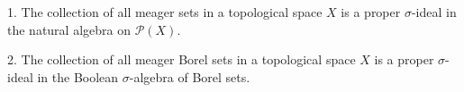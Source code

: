 1. The collection of all meager sets in a topological space $X$ is a proper $\sigma$-ideal in the natural algebra on $\mathcal{P}(X)$.

2. The collection of all meager Borel sets in a topological space $X$ is a proper $\sigma$-ideal in the Boolean $\sigma$-algebra of Borel sets.
